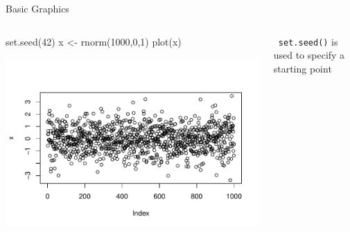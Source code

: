 \documentclass[11pt,german,hideothersubsections]{beamer}
\newcommand{\R}[1]{{\tt \color{blue}  #1}}
\begin{document}
\begin{frame}[fragile]{Basic Graphics}

\begin{columns}
\begin{column}{.5\textwidth}
\begin{Schunk}
\begin{Sinput}
 set.seed(42)
 x <- rnorm(1000,0,1)
 plot(x)
\end{Sinput}
\end{Schunk}
\includegraphics{Day1-010}
\end{column}
\vspace{.25cm}
\begin{column}{.5\textwidth}

\R{set.seed()} is used to specify a starting point


\end{column}
\end{columns}
\end{frame}
\end{document}
